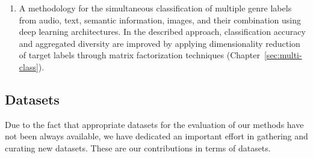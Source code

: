 \begin{enumerate}

\item 
A methodology for the simultaneous classification of multiple genre labels from audio, text, semantic information, images, and their combination using deep learning architectures. In the described approach, classification accuracy and aggregated diversity are improved by applying dimensionality reduction of target labels through matrix factorization techniques (Chapter~\ref{sec:multi-class}). %

\end{enumerate}

\subsection{Datasets}

Due to the fact that appropriate datasets for the evaluation of our methods have not been always available, we have dedicated an important effort in gathering and curating new datasets. These are our contributions in terms of datasets.

